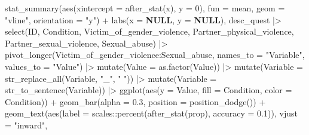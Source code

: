 \documentclass[
  bookmarksnumbered]{article}
\newenvironment{Shaded}{\begin{snugshade}}{\end{snugshade}}
\newcommand{\AttributeTok}[1]{\textcolor[rgb]{0.80,0.80,0.80}{#1}}
\newcommand{\ConstantTok}[1]{\textcolor[rgb]{0.86,0.64,0.64}{\textbf{#1}}}
\newcommand{\DecValTok}[1]{\textcolor[rgb]{0.86,0.86,0.80}{#1}}
\newcommand{\FloatTok}[1]{\textcolor[rgb]{0.75,0.75,0.82}{#1}}
\newcommand{\FunctionTok}[1]{\textcolor[rgb]{0.94,0.94,0.56}{#1}}
\newcommand{\NormalTok}[1]{\textcolor[rgb]{0.80,0.80,0.80}{#1}}
\newcommand{\SpecialCharTok}[1]{\textcolor[rgb]{0.86,0.64,0.64}{#1}}
\newcommand{\StringTok}[1]{\textcolor[rgb]{0.80,0.58,0.58}{#1}}
\begin{document}
\begin{Shaded}
\begin{Highlighting}[]
            \FunctionTok{stat\_summary}\NormalTok{(}\FunctionTok{aes}\NormalTok{(}\AttributeTok{xintercept =} \FunctionTok{after\_stat}\NormalTok{(x), }\AttributeTok{y =} \DecValTok{0}\NormalTok{),}
                         \AttributeTok{fun =}\NormalTok{ mean, }\AttributeTok{geom =} \StringTok{"vline"}\NormalTok{, }\AttributeTok{orientation =} \StringTok{"y"}\NormalTok{) }\SpecialCharTok{+}
            \FunctionTok{labs}\NormalTok{(}\AttributeTok{x =} \ConstantTok{NULL}\NormalTok{, }\AttributeTok{y =} \ConstantTok{NULL}\NormalTok{),}
\NormalTok{          desc\_quest }\SpecialCharTok{|\textgreater{}} 
            \FunctionTok{select}\NormalTok{(ID, Condition, }
\NormalTok{                   Victim\_of\_gender\_violence, }
\NormalTok{                   Partner\_physical\_violence,}
\NormalTok{                   Partner\_sexual\_violence,}
\NormalTok{                   Sexual\_abuse) }\SpecialCharTok{|\textgreater{}} 
            \FunctionTok{pivot\_longer}\NormalTok{(Victim\_of\_gender\_violence}\SpecialCharTok{:}\NormalTok{Sexual\_abuse,}
                         \AttributeTok{names\_to =} \StringTok{"Variable"}\NormalTok{,}
                         \AttributeTok{values\_to =} \StringTok{"Value"}\NormalTok{) }\SpecialCharTok{|\textgreater{}} 
            \FunctionTok{mutate}\NormalTok{(}\AttributeTok{Value =} \FunctionTok{as.factor}\NormalTok{(Value)) }\SpecialCharTok{|\textgreater{}} 
            \FunctionTok{mutate}\NormalTok{(}\AttributeTok{Variable =} \FunctionTok{str\_replace\_all}\NormalTok{(Variable, }
                                              \StringTok{"\_"}\NormalTok{, }\StringTok{" "}\NormalTok{)) }\SpecialCharTok{|\textgreater{}} 
            \FunctionTok{mutate}\NormalTok{(}\AttributeTok{Variable =} \FunctionTok{str\_to\_sentence}\NormalTok{(Variable)) }\SpecialCharTok{|\textgreater{}} 
            \FunctionTok{ggplot}\NormalTok{(}\FunctionTok{aes}\NormalTok{(}\AttributeTok{y =}\NormalTok{ Value, }\AttributeTok{fill =}\NormalTok{ Condition, }\AttributeTok{color =}\NormalTok{ Condition)) }\SpecialCharTok{+}
            \FunctionTok{geom\_bar}\NormalTok{(}\AttributeTok{alpha =} \FloatTok{0.3}\NormalTok{, }\AttributeTok{position =} \FunctionTok{position\_dodge}\NormalTok{()) }\SpecialCharTok{+}
            \FunctionTok{geom\_text}\NormalTok{(}\FunctionTok{aes}\NormalTok{(}\AttributeTok{label =}\NormalTok{ scales}\SpecialCharTok{::}\FunctionTok{percent}\NormalTok{(}\FunctionTok{after\_stat}\NormalTok{(prop), }\AttributeTok{accuracy =} \FloatTok{0.1}\NormalTok{)),}
                      \AttributeTok{vjust =} \StringTok{"inward"}\NormalTok{,}

\end{Highlighting}
\end{Shaded}
\end{document}
